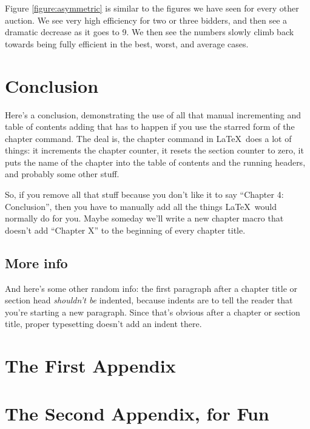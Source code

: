 \documentclass[12pt,twoside]{reedthesis}
\begin{document}
Figure \ref{figure:asymmetric} is similar to the figures we  have seen for every other auction. We see very high efficiency for two or three bidders, and then see a dramatic decrease as it goes to 9. We then see the numbers slowly climb back towards being fully efficient in the best, worst, and average cases.
\chapter*{Conclusion}
	\setcounter{chapter}{4}
	\setcounter{section}{0}
	
Here's a conclusion, demonstrating the use of all that manual incrementing and table of contents adding that has to happen if you use the starred form of the chapter command. The deal is, the chapter command in \LaTeX\ does a lot of things: it increments the chapter counter, it resets the section counter to zero, it puts the name of the chapter into the table of contents and the running headers, and probably some other stuff. 

So, if you remove all that stuff because you don't like it to say ``Chapter 4: Conclusion'', then you have to manually add all the things \LaTeX\ would normally do for you. Maybe someday we'll write a new chapter macro that doesn't add ``Chapter X'' to the beginning of every chapter title.

\section{More info}
And here's some other random info: the first paragraph after a chapter title or section head \emph{shouldn't be} indented, because indents are to tell the reader that you're starting a new paragraph. Since that's obvious after a chapter or section title, proper typesetting doesn't add an indent there. 


    \appendix
      \chapter{The First Appendix}
      \chapter{The Second Appendix, for Fun}


\end{document}
